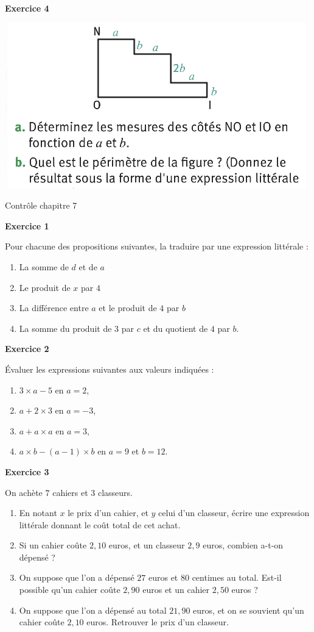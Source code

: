 \documentclass[14pt]{extreport}
\theoremstyle{plain}
\begin{document}
\textbf{Exercice 4} %

\includegraphics[scale=1.4]{exo}

\newpage
\begin{center}{\Large Contrôle chapitre 7}\end{center}
\textbf{Exercice 1}  %

Pour chacune des propositions suivantes, la traduire par une expression littérale : 

\begin{enumerate}
\item La somme de $d$ et de $a$
\item Le produit de $x$ par $4$
\item La différence entre $a$ et le produit de $4$ par $b$
\item La somme du produit de $3$ par $c$ et du quotient de $4$ par $b$. 
\end{enumerate}


\textbf{Exercice 2} %

Évaluer les expressions suivantes aux valeurs indiquées : 

\begin{enumerate}
\item $3\times a - 5$ en $a=2$, 

\item $a + 2 \times 3$ en $a= -3$, 
\item $a + a \times a$ en $a= 3$, 
\item $ a \times b - (a - 1) \times b $ en $a= 9$ et $b= 12$. 
\end{enumerate}

 \textbf{Exercice 3 }
 
On achète $7$ cahiers et $3$ classeurs.

\begin{enumerate}
\item En notant $x$ le prix d'un cahier, et $y$ celui d'un classeur, écrire une expression littérale donnant le coût total de cet achat. 
\item Si un cahier coûte $2,10$ euros, et un classeur $2,9$ euros, combien a-t-on dépensé ? 
\item On suppose que l'on a dépensé $27$ euros et $80$ centimes au total. Est-il possible qu'un cahier coûte $2,90$ euros et un cahier $2,50$ euros ? 
\item On suppose que l'on a dépensé au total $21,90$ euros, et on se souvient qu'un cahier coûte $2,10$ euros. Retrouver le prix d'un classeur. 
\end{enumerate}
 
\end{document}
